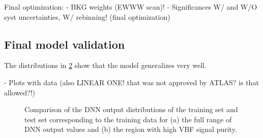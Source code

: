 Final optimization:
-  BKG weights (EWWW scan)!
-  Significances W/ and W/O syst uncertainties, W/ rebinning! (final optimization)



\begin{figure}[t]
    \caption{}
    \label{fig:ew-fraction-scan}
\end{figure}

\subsection{Final model validation}

The distributions in \cref{fig:dnn-train-vs-test} show that the model generalizes very well.

- Plots with data (also LINEAR ONE! that was not approved by ATLAS? is that allowed?!)


\begin{figure}[t]
    \caption{Comparison of the DNN output distributions of the training set and test set corresponding to the training data for (a) the full range of DNN output values and (b) the region with high VBF signal purity.}
    \label{fig:dnn-train-vs-test}
\end{figure}
